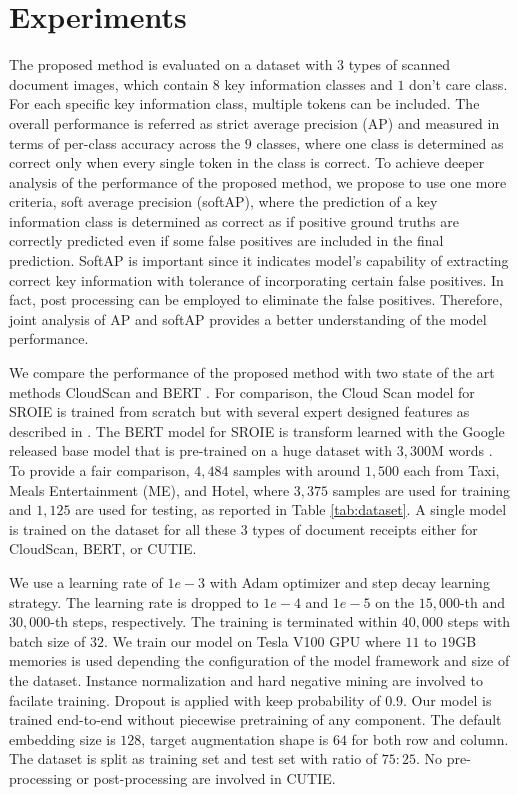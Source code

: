 \documentclass[10pt,twocolumn,letterpaper]{article}
\begin{document}
\section{Experiments}
\label{experiment}
The proposed method is evaluated on a dataset with $3$ types of scanned document images, which contain $8$ key information classes and $1$ don't care class. For each specific key information class, multiple tokens can be included. The overall performance is referred as strict average precision (AP) and measured in terms of per-class accuracy across the $9$ classes, where one class is determined as correct only when every single token in the class is correct. To achieve deeper analysis of the performance of the proposed method, we propose to use one more criteria, soft average precision (softAP), where the prediction of a key information class is determined as correct as if positive ground truths are correctly predicted even if some false positives are included in the final prediction. SoftAP is important since it indicates model's capability of extracting correct key information with tolerance of incorporating certain false positives. In fact, post processing can be employed to eliminate the false positives. Therefore, joint analysis of AP and softAP provides a better understanding of the model performance.

We compare the performance of the proposed method with two state of the art methods CloudScan \cite{cloudscan} and BERT \cite{bert}. For comparison, the Cloud Scan model for SROIE is trained from scratch but with several expert designed features as described in \cite{cloudscan}. The BERT model for SROIE is transform learned with the Google released base model that is pre-trained on a huge dataset with $3,300$M words \cite{bert,bertgit}. To provide a fair comparison, $4,484$ samples with around $1,500$ each from Taxi, Meals Entertainment (ME), and Hotel, where $3,375$ samples are used for training and $1,125$ are used for testing, as reported in Table \ref{tab:dataset}. A single model is trained on the dataset for all these $3$ types of document receipts either for CloudScan, BERT, or CUTIE.

We use a learning rate of $1e-3$ with Adam optimizer and step decay learning strategy. The learning rate is dropped to $1e-4$ and $1e-5$ on the $15,000$-th and $30,000$-th steps, respectively. The training is terminated within $40,000$ steps with batch size of $32$. We train our model on Tesla V100 GPU where $11$ to $19$GB memories is used depending the configuration of the model framework and size of the dataset. Instance normalization and hard negative mining are involved to facilate training. Dropout is applied with keep probability of $0.9$. Our model is trained end-to-end without piecewise pretraining of any component. The default embedding size is $128$, target augmentation shape is $64$ for both row and column. The dataset is split as training set and test set with ratio of $75:25$. No pre-processing or post-processing are involved in CUTIE.
\end{document}
